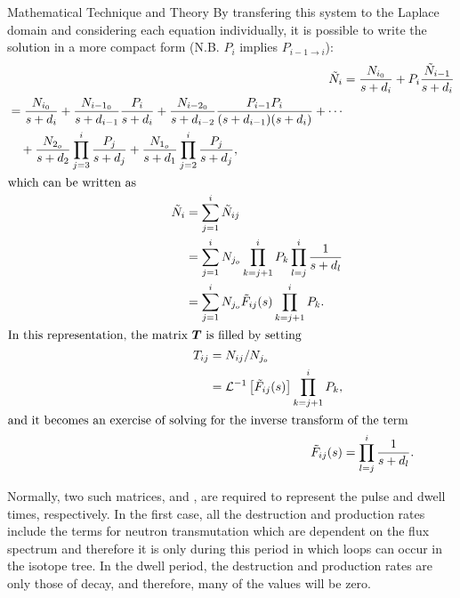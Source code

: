 \begin{chapter}{Mathematical Technique and Theory}
By transfering this system to the Laplace domain and considering each
equation individually, it is possible to write the solution in a more
compact form (N.B. $P_{i}$ implies $P_{i-1 \rightarrow i}$):
\begin{align}
  \tilde{N}_i &= \frac{N_{i_0}}{s+d_i} + P_i
  \frac{\tilde{N}_{i-1}}{s+d_i}\\
  \begin{split}
    &= \frac{N_{i_0}}{s+d_i} + 
    \frac{N_{i-1_0}}{s+d_{i-1}}\frac{P_i}{s+d_i} +
    \frac{N_{i-2_0}}{s+d_{i-2}}\frac{P_{i-1}P_i}{(s+d_{i-1})(s+d_i)} + 
    \cdots\\
    &\quad+\frac{N_{2_o}}{s+d_2}\prod_{j=3}^i\frac{P_{j}}{s+d_{j}} +
    \frac{N_{1_o}}{s+d_1}\prod_{j=2}^i\frac{P_j}{s+d_{j}},\\
  \end{split}\\
  \intertext{which can be written as}
  \begin{split}
    \tilde{N}_i & = \sum_{j=1}^i \tilde{N}_{ij} \\
    & = \sum_{j=1}^i N_{j_o} \prod_{k=j+1}^i P_k \prod_{l=j}^i
    \frac{1}{s+d_l} \\
    & = \sum_{j=1}^i N_{j_o} \tilde{F}_{ij}(s)
    \prod_{k=j+1}^i P_k.\label{eq:math.full.prob}\\
  \end{split}\\
  \intertext{In this representation, the matrix \mbox{\boldmath $T$} is filled by setting}
  \begin{split}
    T_{ij} &= N_{ij}/N_{j_o}\\ &=
    \mathcal{L}^{-1}\left[\tilde{F}_{ij}(s)\right] \prod_{k=j+1}^{i}
    P_k,\\
  \end{split}\label{eq:math.intro.filler}\\
  \intertext{and it becomes an exercise of solving for the inverse
    transform of the term}
  \tilde{F}_{ij}(s) &= \prod_{l=j}^i \frac{1}{s+d_l}\label{eq:math.root.prob}.
\end{align}

Normally, two such matrices,  and , are required to
represent the pulse and dwell times, respectively.  In the first case,
all the destruction and production rates include the terms for neutron
transmutation which are dependent on the flux spectrum and therefore
it is only during this period in which loops can occur in the isotope
tree.  In the dwell period, the destruction and production rates are
only those of decay, and therefore, many of the values will be zero.



\end{chapter}
